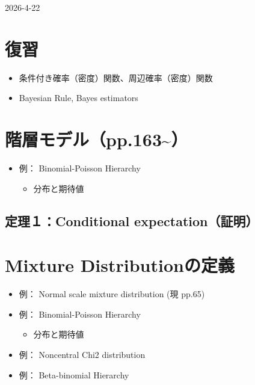 \documentclass[
]{book}
\providecommand{\tightlist}{%
  \setlength{\itemsep}{0pt}\setlength{\parskip}{0pt}}
\begin{document}
2026-4-22

\section{復習}\label{ux5fa9ux7fd2-1}

\begin{itemize}
\tightlist
\item
  条件付き確率（密度）関数、周辺確率（密度）関数
\item
  Bayesian Rule, Bayes estimators
\end{itemize}

\section{階層モデル（pp.163\textasciitilde）}\label{ux968eux5c64ux30e2ux30c7ux30ebpp.163}

\begin{itemize}
\item
  例： Binomial-Poisson Hierarchy

  \begin{itemize}
  \tightlist
  \item
    分布と期待値
  \end{itemize}
\end{itemize}

\subsection{定理１：Conditional expectation（証明）}\label{ux5b9aux7406uxff11conditional-expectationux8a3cux660e}

\section{Mixture Distributionの定義}\label{mixture-distributionux306eux5b9aux7fa9}

\begin{itemize}
\item
  例： Normal scale mixture distribution (現 pp.65)
\item
  例： Binomial-Poisson Hierarchy

  \begin{itemize}
  \tightlist
  \item
    分布と期待値
  \end{itemize}
\item
  例： Noncentral Chi2 distribution
\item
  例： Beta-binomial Hierarchy
\end{itemize}
\end{document}
